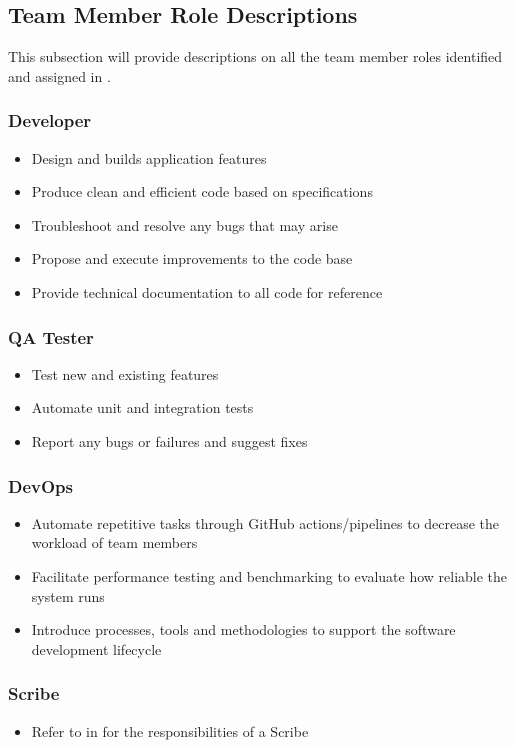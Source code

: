 \documentclass[12pt,letterpaper]{article}
\begin{document}
\subsection{Team Member Role Descriptions}
This subsection will provide descriptions on all the team member roles
identified and assigned in .
\subsubsection{Developer}
\begin{itemize}
    \item Design and builds application features
    \item Produce clean and efficient code based on specifications 
    \item Troubleshoot and resolve any bugs that may arise 
    \item Propose and execute improvements to the code base
    \item Provide technical documentation to all code for reference
\end{itemize}

\subsubsection{QA Tester}
\begin{itemize}
    \item Test new and existing features
    \item Automate unit and integration tests
    \item Report any bugs or failures and suggest fixes 
\end{itemize}

\subsubsection{DevOps}
\begin{itemize}
    \item Automate repetitive tasks through GitHub actions/pipelines to decrease
    the workload of team members
    \item Facilitate performance testing and benchmarking to evaluate how
    reliable the system runs
    \item Introduce processes, tools and methodologies to support the software
    development lifecycle
\end{itemize}

\subsubsection{Scribe}
\begin{itemize}
    \item Refer to  in  for the
    responsibilities of a Scribe
\end{itemize}
\end{document}
